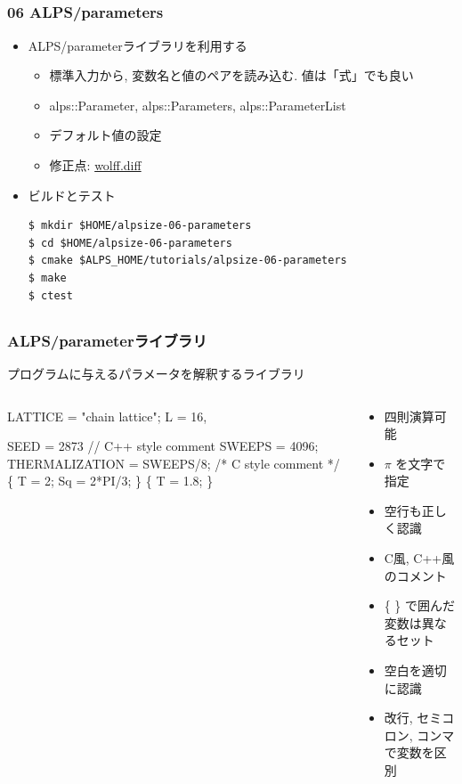 \subsection*{\redm\whitem\greenb}
\begin{frame}[fragile]
  \frametitle{06 ALPS/parameters}
  \begin{itemize}
    \item ALPS/parameterライブラリを利用する
      \begin{itemize}
        \item 標準入力から, 変数名と値のペアを読み込む. 値は「式」でも良い
        \item alps::Parameter, alps::Parameters, alps::ParameterList
        \item デフォルト値の設定
        \item 修正点: \href{https://github.com/cmsi/alps-tutorial/blob/develop/alpsize/06-wolff.diff}{wolff.diff}
      \end{itemize}
    \item ビルドとテスト
\begin{lstlisting}
$ mkdir $HOME/alpsize-06-parameters
$ cd $HOME/alpsize-06-parameters
$ cmake $ALPS_HOME/tutorials/alpsize-06-parameters
$ make
$ ctest
\end{lstlisting}
  \end{itemize}
\end{frame}

\subsection*{\redm\whitem\greenb}
\begin{frame}[fragile]
  \frametitle{ALPS/parameterライブラリ}
  プログラムに与えるパラメータを解釈するライブラリ
  \begin{columns}
    \begin{column}{6cm}
\begin{semiverbatim}
LATTICE = "chain lattice";
L = 16,

SEED = 2873
// C++ style comment
SWEEPS = 4096;
THERMALIZATION = \alert<1>{SWEEPS/8};
/* C style comment */
\{ T = 2; Sq = 2*\alert<2>{PI}/3; \}
\{ T = 1.8; \}
\end{semiverbatim}
    \end{column}
    \begin{column}{6cm}
      \begin{itemize}
      \item 四則演算可能
      \item $\pi$ を文字で指定
      \item 空行も正しく認識
      \item C風, C++風のコメント
      \item \{ \} で囲んだ変数は異なるセット
      \item 空白を適切に認識
      \item 改行, セミコロン, コンマで変数を区別
      \end{itemize}
    \end{column}
  \end{columns}
\end{frame}

